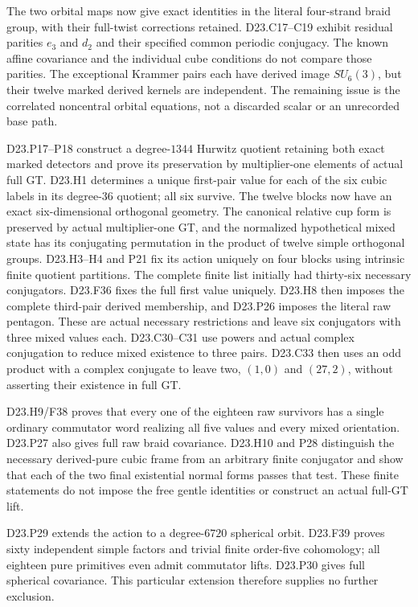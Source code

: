 \documentclass[11pt]{article}
\begin{document}
The two orbital maps now give exact identities in the literal
four-strand braid group, with their full-twist corrections retained.
D23.C17--C19 exhibit residual parities $e_3$ and $d_2$ and their
specified common periodic conjugacy. The known affine covariance
and the individual cube conditions do not compare those parities.
The exceptional Krammer pairs each have derived image $SU_6(3)$,
but their twelve marked derived kernels are independent.
The remaining issue is the correlated noncentral orbital equations,
not a discarded scalar or an unrecorded base path.

D23.P17--P18 construct a degree-$1344$ Hurwitz quotient retaining
both exact marked detectors and prove its preservation by multiplier-one elements of actual
full GT. D23.H1 determines a unique first-pair value for each of
the six cubic labels in its degree-$36$ quotient; all six survive.
The twelve blocks now have an exact six-dimensional orthogonal
geometry. The canonical relative cup form is preserved by actual
multiplier-one GT, and the normalized hypothetical mixed state
has its conjugating permutation in the product of twelve simple
orthogonal groups. D23.H3--H4 and P21 fix its action uniquely on
four blocks using intrinsic finite quotient partitions. The
complete finite list initially had thirty-six necessary conjugators.
D23.F36 fixes the full first value uniquely. D23.H8 then imposes
the complete third-pair derived membership, and D23.P26 imposes
the literal raw pentagon. These are actual necessary restrictions
and leave six conjugators with three mixed values each.
D23.C30--C31 use powers and actual complex conjugation to reduce
mixed existence to three pairs. D23.C33 then uses an odd product
with a complex conjugate to leave two, $(1,0)$ and $(27,2)$,
without asserting their existence in full GT.

D23.H9/F38 proves that every one of the eighteen raw survivors
has a single ordinary commutator word realizing all five values
and every mixed orientation. D23.P27 also gives full raw braid
covariance. D23.H10 and P28 distinguish the necessary derived-pure
cubic frame from an arbitrary finite conjugator and show that
each of the two final existential normal forms passes that test.
These finite statements do not impose the free gentle identities
or construct an actual full-GT lift.

D23.P29 extends the action to a degree-$6720$ spherical orbit.
D23.F39 proves sixty independent simple factors and trivial
finite order-five cohomology; all eighteen pure primitives even
admit commutator lifts. D23.P30 gives full spherical covariance.
This particular extension therefore supplies no further exclusion.
\end{document}
